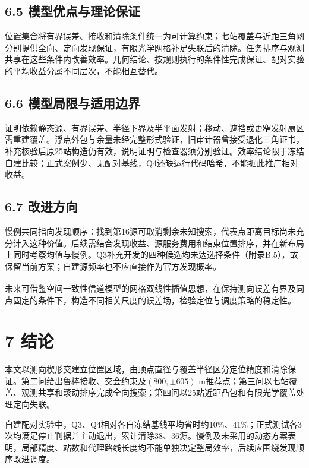 \documentclass[UTF8,fontset=none,zihao=-4,a4paper]{ctexart}
\begin{document}
\FloatBarrier
\subsection{6.5 模型优点与理论保证}\label{ux6a21ux578bux4f18ux70b9ux4e0eux7406ux8bbaux4fddux8bc1}

位置集合将有界误差、接收和清除条件统一为可计算约束；七站覆盖与近距三角网分别提供全向、定向发现保证，有限光学网格补足失联后的清除。任务排序与观测共享在这些条件内改善效率。几何结论、按规则执行的条件性完成保证、配对实验的平均收益分属不同层次，不能相互替代。

\subsection{6.6 模型局限与适用边界}\label{ux6a21ux578bux5c40ux9650ux4e0eux9002ux7528ux8fb9ux754c}

证明依赖静态源、有界误差、半径下界及半平面发射；移动、遮挡或更窄发射扇区需重建覆盖。浮点外包与余量未经完整形式验证，旧审计器曾接受退化三角证书，补充核验后原25站构造仍有效，说明证明与检查器须分别验证。效率结论限于冻结自建比较；正式案例少、无配对基线，Q4还缺运行代码哈希，不能据此推广相对收益。

\subsection{6.7 改进方向}\label{ux6539ux8fdbux65b9ux5411}

慢例共同指向发现顺序：找到第16源可取消剩余未知搜索，代表点距离目标尚未充分计入这种价值。后续需结合发现收益、源服务费用和结束位置排序，并在新布局上同时考察均值与慢例。Q3补充开发的四种候选均未达选择条件（附录B.5），故保留当前方案；自建源频率也不应直接作为官方发现概率。

未来可借鉴空间一致性信道模型的网格双线性插值思想\textsuperscript{\cite{ademaj2019}}，在保持测向误差有界及同点固定的条件下，构造不同相关尺度的误差场，检验定位与调度策略的稳定性。

\section{7 结论}\label{ux7ed3ux8bba}

本文以测向楔形交建立位置区域，由顶点直径与覆盖半径区分定位精度和清除保证。第二问给出鲁棒接收、交会约束及\((800,\pm605)\) m推荐点；第三问以七站覆盖、观测共享和滚动排序完成全向搜索；第四问以25站近距凸包和有限光学覆盖处理定向失联。

自建配对实验中，Q3、Q4相对各自冻结基线平均省时约10\%、41\%；正式测试各3次均满足停止判据并主动退出，累计清除38、36源。慢例及未采用的动态方案表明，局部精度、站数和代理路线长度均不能单独决定整局效率，后续应围绕发现顺序改进调度。
\end{document}
